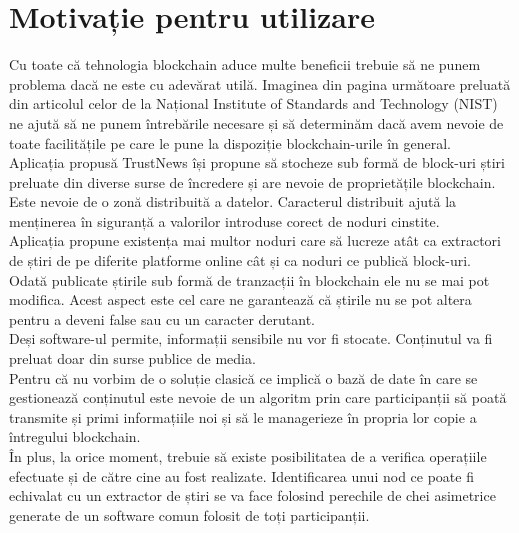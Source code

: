 \clearpage

\section{Motivație pentru utilizare}

Cu toate că tehnologia blockchain aduce multe beneficii trebuie să ne punem problema dacă ne este cu adevărat utilă. Imaginea din pagina următoare preluată din articolul celor de la Național Institute of Standards and Technology (NIST) ne ajută să ne punem întrebările necesare și să determinăm dacă avem nevoie de toate facilitățile pe care le pune la dispoziție blockchain-urile în general.\\

Aplicația propusă TrustNews își propune să stocheze sub formă de block-uri știri preluate din diverse surse de încredere și are nevoie de proprietățile blockchain.\\

Este nevoie de o zonă distribuită a datelor. Caracterul distribuit ajută la menținerea în siguranță a valorilor introduse corect de noduri cinstite.\\

Aplicația propune existența mai multor noduri care să lucreze atât ca extractori de știri de pe diferite platforme online cât și ca noduri ce publică block-uri.\\

Odată publicate știrile sub formă de tranzacții în blockchain ele nu se mai pot modifica. Acest aspect este cel care ne garantează că știrile nu se pot altera pentru a deveni false sau cu un caracter derutant.\\

Deși software-ul permite, informații sensibile nu vor fi stocate. Conținutul va fi preluat doar din surse publice de media.\\

Pentru că nu vorbim de o soluție clasică ce implică o bază de date în care se gestionează conținutul este nevoie de un algoritm prin care participanții să poată transmite și primi informațiile noi și să le managerieze în propria lor copie a întregului blockchain.\\

În plus, la orice moment, trebuie să existe posibilitatea de a verifica operațiile efectuate și de către cine au fost realizate. Identificarea unui nod ce poate fi echivalat cu un extractor de știri se va face folosind perechile de chei asimetrice generate de un software comun folosit de toți participanții.\\


